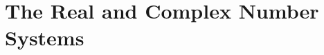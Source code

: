 \documentclass[../main.tex]{subfiles}
\begin{document}
\section{The Real and Complex Number Systems}


\end{document}
